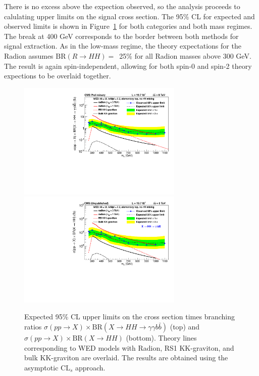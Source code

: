 There is no excess above the expection observed, so the analysis proceeds to calulating
upper limits on the signal cross section. The 95\% CL for expected and observed limits is
shown in Figure~\ref{fig:limits_allres}
for both categories and both mass regimes. The break at 400 GeV corresponds
to the border between both methods for signal extraction.
As in the low-mass regime, the theory expectations for the Radion assumes
$\text{BR}(R\rightarrow HH) =$~25\% for all Radion masses above 300 GeV. The result is again
spin-independent, allowing for both spin-0 and spin-2 theory expections to be overlaid together.

\begin{figure}[ht]
 \begin{center}
   \includegraphics[width=0.7\textwidth]{figures/results/WP4_cutbased_all.pdf}
   \includegraphics[width=0.7\textwidth]{figures/results/WP4_cutbased_HH.pdf}
 \end{center}
\caption{Expected 95\% CL upper limits on the cross section times branching ratios
$\sigma(pp\rightarrow X) \times \text{BR}( X \rightarrow HH \rightarrow \gamma\gamma b\bar{b})$ (top)
and $\sigma(pp\rightarrow X) \times \text{BR}( X \rightarrow HH )$ (bottom).
Theory lines corresponding to WED models with Radion, RS1 KK-graviton, and bulk KK-graviton are
overlaid. The results are obtained using the asymptotic $\text{CL}_s$ approach.}
\label{fig:limits_allres}
\end{figure}

